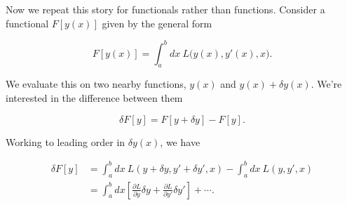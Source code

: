 \documentclass[11pt,a4paper,twoside]{article}
\newcommand{\pnum}[1]{\makebox[0pt][r]{\scriptsize\textbf{[#1]}\hspace{0.7em}}}
\newif\ifstudynotes
\newcommand{\StudyNote}[2]{\ifstudynotes\begin{studyNote}[title={#1}]#2\end{studyNote}\fi}
\begin{document}
\noindent\pnum{6}Now we repeat this story for functionals rather than functions. Consider a functional $F[y(x)]$ given by the general form

\begin{equation}
    F[y(x)]=\int_a^b dx\ L\bigl(y(x),y'(x),x\bigr).\tag{7.7}
\end{equation}

\noindent\pnum{7}We evaluate this on two nearby functions, $y(x)$ and $y(x)+\delta y(x)$. We're interested in the difference between them

\begin{equation}
    \delta F[y]=F[y+\delta y]-F[y].\tag{7.8}
\end{equation}

\noindent\pnum{8}Working to leading order in $\delta y(x)$, we have

\begin{equation}
    \begin{aligned}
        \delta F[y] & =\int_a^b dx\ L(y+\delta y,y'+\delta y',x)-\int_a^b dx\ L(y,y',x)                                               \\
                    & =\int_a^b dx\left[\frac{\partial L}{\partial y}\delta y+\frac{\partial L}{\partial y'}\delta y'\right]+\cdots .
    \end{aligned}\tag{7.9}
\end{equation}




\StudyNote{複習註解：由 (7.7) 到 (7.9)}{

    把 $y(x)$ 改成 $y(x)+\delta y(x)$ 時，導數同時改成

    \[
        (y+\delta y)'=y'+\delta y',\qquad
        \delta y'=\frac{d}{dx}(\delta y).
    \]

    因此 $F[y+\delta y]$ 的被積函數是 $L(y+\delta y,y'+\delta y',x)$。

    在同一個固定的 $x$，依 (7.5) 對 $L$ 的前兩個引數做泰勒展開：

    \[
        L(y+\delta y,y'+\delta y',x)
        =L(y,y',x)+\frac{\partial L}{\partial y}\delta y
        +\frac{\partial L}{\partial y'}\delta y'+\cdots .
    \]

    偏導數都在原本的 $(y(x),y'(x),x)$ 處取值；$x$ 沒有變動，故沒有

    $(\partial L/\partial x)\delta x$ 項。減去原本的 $L$ 再積分，即得 (7.9)。

    省略的是 $(\delta y)^2$、$\delta y\,\delta y'$、$(\delta y')^2$ 等二階以上的項。



    例如 $L=y^2+(y')^2$，直接相減可得

    \[
        \Delta L=2y\,\delta y+2y'\,\delta y'+(\delta y)^2+(\delta y')^2.
    \]

    保留一階項，正好就是 $L_y\delta y+L_{y'}\delta y'$。

}
\end{document}
